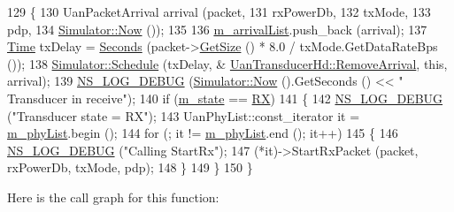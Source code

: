 \begin{DoxyCode}
129 \{
130   UanPacketArrival arrival (packet,
131                             rxPowerDb,
132                             txMode,
133                             pdp,
134                             \hyperlink{classns3_1_1Simulator_ac3178fa975b419f7875e7105be122800}{Simulator::Now} ());
135 
136   \hyperlink{classns3_1_1UanTransducerHd_a7cddd8b5406534b21219ffd643be33fa}{m\_arrivalList}.push\_back (arrival);
137   \hyperlink{namespacens3_1_1TracedValueCallback_a7ffd3e7c142ffe7c8a1d2db9b8de38ec}{Time} txDelay = \hyperlink{group__timecivil_ga33c34b816f8ff6628e33d5c8e9713b9e}{Seconds} (packet->\hyperlink{classns3_1_1Packet_a462855c9929954d4301a4edfe55f4f1c}{GetSize} () * 8.0 / txMode.GetDataRateBps ());
138   \hyperlink{classns3_1_1Simulator_a671882c894a08af4a5e91181bf1eec13}{Simulator::Schedule} (txDelay, &
      \hyperlink{classns3_1_1UanTransducerHd_a8e3adc6fbd713988985d33060bc1f1fc}{UanTransducerHd::RemoveArrival}, \textcolor{keyword}{this}, arrival);
139   \hyperlink{group__logging_ga413f1886406d49f59a6a0a89b77b4d0a}{NS\_LOG\_DEBUG} (\hyperlink{classns3_1_1Simulator_ac3178fa975b419f7875e7105be122800}{Simulator::Now} ().GetSeconds () << \textcolor{stringliteral}{" Transducer in receive"});
140   \textcolor{keywordflow}{if} (\hyperlink{classns3_1_1UanTransducerHd_a4f7b41e0c43685c3e6abebd1a543ab36}{m\_state} == \hyperlink{classns3_1_1UanTransducer_a037314c27ca07c9c6234460086058bcea7f900390ec167f157963a7147db7ab2b}{RX})
141     \{
142       \hyperlink{group__logging_ga413f1886406d49f59a6a0a89b77b4d0a}{NS\_LOG\_DEBUG} (\textcolor{stringliteral}{"Transducer state = RX"});
143       UanPhyList::const\_iterator it = \hyperlink{classns3_1_1UanTransducerHd_afb3b10ff175e4f315894b9ba13a8c490}{m\_phyList}.begin ();
144       \textcolor{keywordflow}{for} (; it != \hyperlink{classns3_1_1UanTransducerHd_afb3b10ff175e4f315894b9ba13a8c490}{m\_phyList}.end (); it++)
145         \{
146           \hyperlink{group__logging_ga413f1886406d49f59a6a0a89b77b4d0a}{NS\_LOG\_DEBUG} (\textcolor{stringliteral}{"Calling StartRx"});
147           (*it)->StartRxPacket (packet, rxPowerDb, txMode, pdp);
148         \}
149     \}
150 \}
\end{DoxyCode}


Here is the call graph for this function\+:


